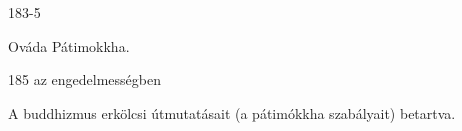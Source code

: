 
\begin{notesdescription}

\item[{183-5}
{}
{}]

Ováda Pátimokkha.

\item[{185}
{az engedelmességben}
{}] \hfill\par

A buddhizmus erkölcsi útmutatásait (a pátimókkha szabályait) betartva.


\end{notesdescription}

